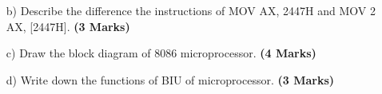 \documentclass{article}
\begin{document}
\begin{enumerate}
    \item[b)] Describe the difference the instructions of MOV AX, 2447H and MOV 2 AX, [2447H]. \hspace{1cm} \textbf{(3 Marks)}
    \item[c)] Draw the block diagram of 8086 microprocessor. \hspace{1cm} \textbf{(4 Marks)}
    \item[d)] Write down the functions of BIU of microprocessor. \hspace{1cm} \textbf{(3 Marks)}
\end{enumerate}
\end{document}
